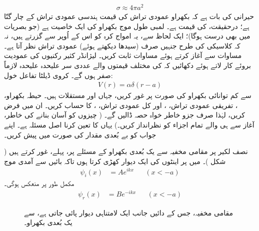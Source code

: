\begin{align}
	\sigma\approx4\pi a^2
\end{align}
حیرانی کی بات ہے کہ بکھراو عمودی تراش کی قیمت ہندسی عمودی تراش کے چار گنّا ہے؛ درحقیقت،  کی قیمت  ہے۔ لمبی طول موج بکھراو کی ایک خاصیت  ہے (جو بصریات میں بھی درست ہوگا)؛ ایک لحاظ سے، یہ امواج کرہ کو  اس کے اُوپر سے گزرتے ہیں، نہ کہ کلاسیکی  کی طرح جنہیں صرف (سیدھا دیکھتے ہوئے) عمودی تراش نظر آتا ہے۔
مساوات  سے آغاز کرتے ہوئے مساوات  ثابت کریں۔  لیژانڈر کثیر رکنیوں کی عمودیت بروئے کار لاتے ہوئے دکھائیں کہ  کی مختلف قیمتوں والے عددی سر علیحدہ علیحدہ لازماً صفر ہوں گے۔
کروی ڈیلٹا تفاعل خول:
\begin{align*}
	V(r) = \alpha\delta(r-a)
\end{align*}
سے کم توانائی بکھراو کی صورت پر غور کریں، جہاں  اور  مستقلات ہیں۔ حیطہ بکھراو، ، تفریقی عمودی تراش، ، اور کل عمودی تراش، ، کا حساب کریں۔ ان میں  فرض کریں، لہٰذا صرف  جزو خاطر خواہ حصہ ڈالیں گے۔ ( چیزوں کو آسان بنانے کی خاطر، آغاز سے ہی  والے تمام اجزاء کو نظرانداز کریں۔) یہاں  کا تعین کرنا اصل مسئلہ ہے۔ اپنے جواب کو بے بُعدی مقدار  کی صورت میں پیش کریں۔

 	


 نصف لکیر  پر مقامی مخفیہ  سے یک بُعدی بکھراو کے مسئلے پر، پہلے، غور کرتے ہیں ( شکل )۔ میں  پر اینٹوں کی ایک دیوار کھڑی کرتا ہوں تاکہ بائیں سے آمدی موج 
\begin{align}
	\psi_i(x) &= Ae^{ikx}&&(x<-a)
\end{align}
مکمل طور پر منعکس ہوگی۔
\begin{align}
	\psi_r(x) &= Be^{-ikx}&&(x<-a)
\end{align}
%
\begin{figure}
\centering
{}
\caption{مقامی مخفیہ، جس کے دائیں جانب ایک لامتناہی دیوار پائی جاتی ہے، سے یک بُعدی بکھراو۔}
\label{شکل_بکھراو_یک_بعدی_مقامی_مخفیہ}
\end{figure}

